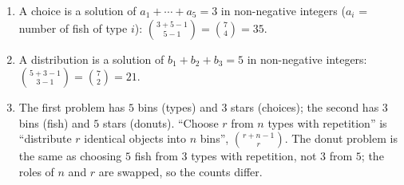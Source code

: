 \begin{enumerate}
\item A choice is a solution of $a_1+\cdots+a_5=3$ in non-negative integers ($a_i$ = number of fish of type $i$): $\binom{3+5-1}{5-1}=\binom74=\boxed{35}$.
\item A distribution is a solution of $b_1+b_2+b_3=5$ in non-negative integers: $\binom{5+3-1}{3-1}=\binom72=\boxed{21}$.
\item The first problem has $5$ bins (types) and $3$ stars (choices); the second has $3$ bins (fish) and $5$ stars (donuts). ``Choose $r$ from $n$ types with repetition'' is ``distribute $r$ identical objects into $n$ bins'', $\binom{r+n-1}{r}$. The donut problem is the same as choosing $5$ fish from $3$ types with repetition, not $3$ from $5$; the roles of $n$ and $r$ are swapped, so the counts differ.
\end{enumerate}

